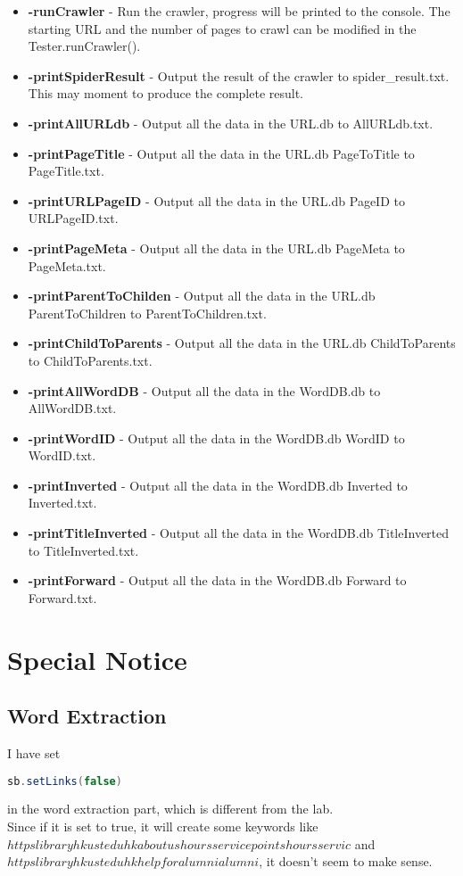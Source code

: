 \documentclass{article}
\begin{document}
        \begin{itemize}
            \item \textbf{-runCrawler} - Run the crawler, progress will be printed to the console. The starting URL and the number of pages to crawl can be modified in the Tester.runCrawler().
            \item \textbf{-printSpiderResult} - Output the result of the crawler to spider\_result.txt. This may moment to produce the complete result.
            \item \textbf{-printAllURLdb} - Output all the data in the URL.db to AllURLdb.txt.
            \item \textbf{-printPageTitle} - Output all the data in the URL.db PageToTitle to PageTitle.txt.
            \item \textbf{-printURLPageID} - Output all the data in the URL.db PageID to URLPageID.txt.
            \item \textbf{-printPageMeta} - Output all the data in the URL.db PageMeta to PageMeta.txt.
            \item \textbf{-printParentToChilden} - Output all the data in the URL.db ParentToChildren to ParentToChildren.txt.
            \item \textbf{-printChildToParents} - Output all the data in the URL.db ChildToParents to ChildToParents.txt.
            \item \textbf{-printAllWordDB} - Output all the data in the WordDB.db to AllWordDB.txt.
            \item \textbf{-printWordID} - Output all the data in the WordDB.db WordID to WordID.txt.
            \item \textbf{-printInverted} - Output all the data in the WordDB.db Inverted to Inverted.txt.
            \item \textbf{-printTitleInverted} - Output all the data in the WordDB.db TitleInverted to TitleInverted.txt.
            \item \textbf{-printForward} - Output all the data in the WordDB.db Forward to Forward.txt.
        \end{itemize}

    \section*{Special Notice}
        \subsection*{Word Extraction}
            I have set 
            \begin{lstlisting}[language=Java]
                sb.setLinks(false)
            \end{lstlisting} 
            in the word extraction part, which is different from the lab. \\[0.4em] 
            Since if it is set to true, it will create some keywords like $httpslibraryhkusteduhkaboutushoursservicepointshoursservic$ and $httpslibraryhkusteduhkhelpforalumnialumni$, it doesn't seem to make sense. 
\end{document}
